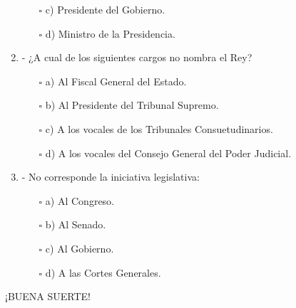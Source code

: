 \documentclass[0.01pt,a4paper,spanish]{article}
\begin{document}
\begin{enumerate}
\begin{itemize}
\item [$\square$] c) Presidente del Gobierno.
\item [$\square$] d) Ministro de la Presidencia.
\end{itemize}
\item - ¿A cual de los siguientes cargos no nombra el Rey?
\begin{itemize} 
\item [$\square$] a) Al Fiscal General del Estado.
\item [$\square$] b) Al Presidente del Tribunal Supremo.
\item [$\square$] c) A los vocales de los Tribunales Consuetudinarios.
\item [$\square$] d) A los vocales del Consejo General del Poder Judicial.
\end{itemize}
\item - No corresponde la iniciativa legislativa:
\begin{itemize} 
\item [$\square$] a) Al Congreso.
\item [$\square$] b) Al Senado.
\item [$\square$] c) Al Gobierno.
\item [$\square$] d) A las Cortes Generales.
\end{itemize}
\end{enumerate}
\bigskip
\begin{center}

¡BUENA SUERTE!

\end{center}
\newpage

\ClearShipoutPicture
\end{document}
